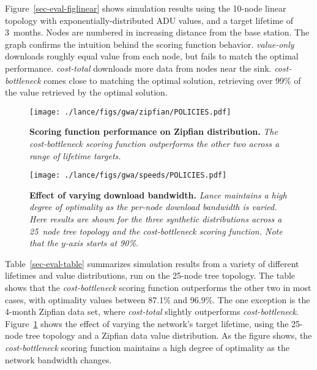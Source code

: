 Figure~\ref{sec-eval-figlinear} shows simulation results using the 10-node
linear topology with exponentially-distributed ADU values, and a target
lifetime of 3~months.  Nodes are numbered in increasing distance from the base
station.  The graph confirms the intuition behind the scoring function
behavior.  \emph{value-only} downloads roughly equal value from each node,
but fails to match the optimal performance. \emph{cost-total} downloads more
data from nodes near the sink.  \emph{cost-bottleneck} comes close to
matching the optimal solution, retrieving over 99\% of the value retrieved by
the optimal solution.

\begin{figure}[t]
\begin{center}
\texttt{[image: ./lance/figs/gwa/zipfian/POLICIES.pdf]}
\end{center}
\caption{\small {\bf Scoring function performance on Zipfian distribution.}
{\em The {\em cost-bottleneck} scoring function outperforms the other two
across a range of lifetime targets.}}
\label{sec-eval-zipfian}
\end{figure}

\begin{figure}[t]
\begin{center}
\texttt{[image: ./lance/figs/gwa/speeds/POLICIES.pdf]}
\end{center}
\caption{\small {\bf Effect of varying download bandwidth.}
{\em Lance
maintains a high degree of optimality as the per-node download 
bandwidth is varied.
Here results are shown for the three synthetic distributions across a 25~node
tree topology and the \emph{cost-bottleneck} scoring function.  
Note that the $y$-axis starts at 90\%.}}
\label{sec-eval-figspeeds}
\end{figure}


Table~\ref{sec-eval-table} summarizes simulation results from a variety of
different lifetimes and value distributions, run on the 25-node tree
topology. The table shows that the {\em cost-bottleneck} scoring function
outperforms the other two in most cases, with optimality values
between 87.1\% and 96.9\%.
The one exception is the 4-month Zipfian data
set, where \emph{cost-total} slightly outperforms 
\emph{cost-bottleneck}. Figure~\ref{sec-eval-zipfian} shows
the effect of varying the network's target lifetime, using the 
25-node tree topology and a Zipfian data value distribution.
As the figure shows, the \emph{cost-bottleneck} scoring function 
maintains a high degree of optimality as the network bandwidth changes.

